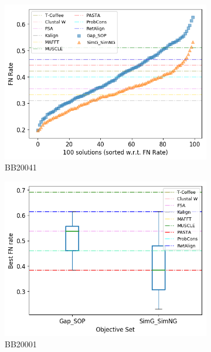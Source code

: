 \begin{figure}[!htbp]
\begin{adjustwidth}{-1cm}{-1cm}
\begin{subfigure}{0.22\textwidth}
			\includegraphics[width=\columnwidth]{Figure/summary/precomputedInit/Balibase/BB20041_fnrate_density_single_run}
			\caption{BB20041}
		\end{subfigure}
		\begin{subfigure}{0.22\textwidth}
			\includegraphics[width=\columnwidth]{Figure/summary/precomputedInit/Balibase/BB20001_objset_fnrate_rank}
			\caption{BB20001}
		\end{subfigure}	
		\begin{subfigure}{0.22\textwidth}

\end{subfigure}
\end{adjustwidth}
\end{figure}
